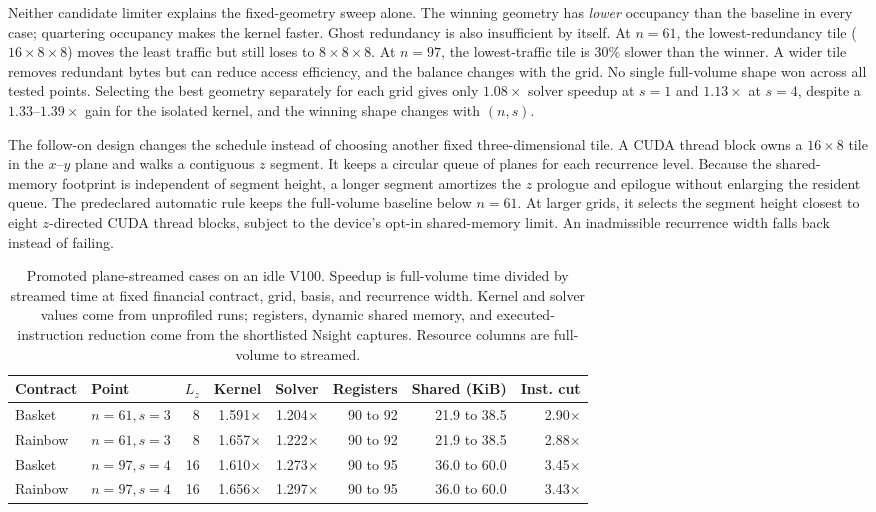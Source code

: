 Neither candidate limiter explains the fixed-geometry sweep alone. The winning geometry has \emph{lower} occupancy than the baseline in every case; quartering occupancy makes the kernel faster. Ghost redundancy is also insufficient by itself. At $n=61$, the lowest-redundancy tile ($16\times8\times8$) moves the least traffic but still loses to $8\times8\times8$. At $n=97$, the lowest-traffic tile is 30\% slower than the winner. A wider tile removes redundant bytes but can reduce access efficiency, and the balance changes with the grid.
No single full-volume shape won across all tested points. Selecting the best geometry separately for each grid gives only $1.08\times$ solver speedup at $s=1$ and $1.13\times$ at $s=4$, despite a $1.33$--$1.39\times$ gain for the isolated kernel, and the winning shape changes with $(n,s)$.

The follow-on design changes the schedule instead of choosing another fixed three-dimensional tile. A CUDA thread block owns a $16\times8$ tile in the $x$--$y$ plane and walks a contiguous $z$ segment. It keeps a circular queue of planes for each recurrence level. Because the shared-memory footprint is independent of segment height, a longer segment amortizes the $z$ prologue and epilogue without enlarging the resident queue. The predeclared automatic rule keeps the full-volume baseline below $n=61$. At larger grids, it selects the segment height closest to eight $z$-directed CUDA thread blocks, subject to the device's opt-in shared-memory limit. An inadmissible recurrence width falls back instead of failing.

\begin{table}[htbp!]
\centering
\small
\setlength{\tabcolsep}{4pt}
\caption{Promoted plane-streamed cases on an idle V100. Speedup is full-volume time divided by streamed time at fixed financial contract, grid, basis, and recurrence width. Kernel and solver values come from unprofiled runs; registers, dynamic shared memory, and executed-instruction reduction come from the shortlisted Nsight captures. Resource columns are full-volume to streamed.}
\label{tab:ca-streamed}
\begin{tabular}{@{}llrrrrrr@{}}
\toprule
\textbf{Contract} & \textbf{Point} & \textbf{$L_z$} & \textbf{Kernel} & \textbf{Solver} & \textbf{Registers} & \textbf{Shared (KiB)} & \textbf{Inst. cut} \\
\midrule
Basket  & $n=61,s=3$ & 8  & 1.591$\times$ & 1.204$\times$ & 90 to 92 & 21.9 to 38.5 & 2.90$\times$ \\
Rainbow & $n=61,s=3$ & 8  & 1.657$\times$ & 1.222$\times$ & 90 to 92 & 21.9 to 38.5 & 2.88$\times$ \\
Basket  & $n=97,s=4$ & 16 & 1.610$\times$ & 1.273$\times$ & 90 to 95 & 36.0 to 60.0 & 3.45$\times$ \\
Rainbow & $n=97,s=4$ & 16 & 1.656$\times$ & 1.297$\times$ & 90 to 95 & 36.0 to 60.0 & 3.43$\times$ \\
\bottomrule
\end{tabular}
\end{table}

